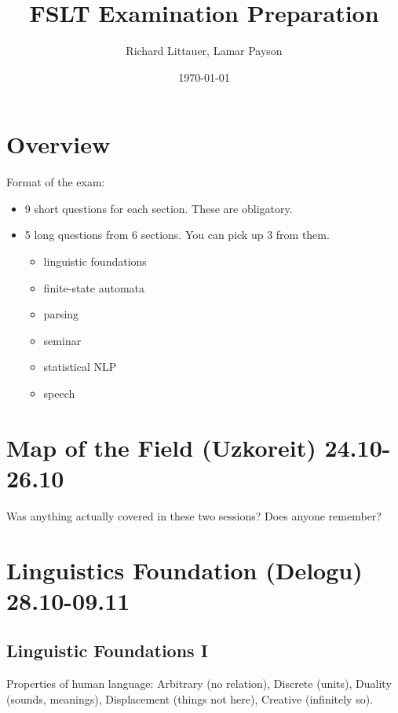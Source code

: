 \documentclass[11pt]{article}
\title{FSLT Examination Preparation}
\author{Richard Littauer, Lamar Payson }		%
\date{\today}                          		%
\newenvironment{itemise}{
\begin{itemize}
  \setlength{\itemsep}{1pt}
  \setlength{\parskip}{0pt}
  \setlength{\parsep}{0pt}
}{\end{itemize}}
\begin{document}
\maketitle
\tableofcontents

\section*{Overview}
Format of the exam:
\begin{itemise}
\item 9 short questions for each section. These are obligatory. 
\item 5 long questions from 6 sections. You can pick up 3 from them. 
\begin{itemise}
\item linguistic foundations
\item finite-state automata
\item parsing
\item seminar
\item statistical NLP
\item speech
\end{itemise}
\end{itemise}
\newpage
\section{Map of the Field (Uzkoreit) 24.10-26.10}

Was anything actually covered in these two sessions? Does anyone remember? 

\section{Linguistics Foundation (Delogu) 28.10-09.11}
\subsection{Linguistic Foundations I}
Properties of human language: Arbitrary (no relation), Discrete (units), Duality (sounds, meanings), Displacement (things not here), Creative (infinitely so).
\end{document}

